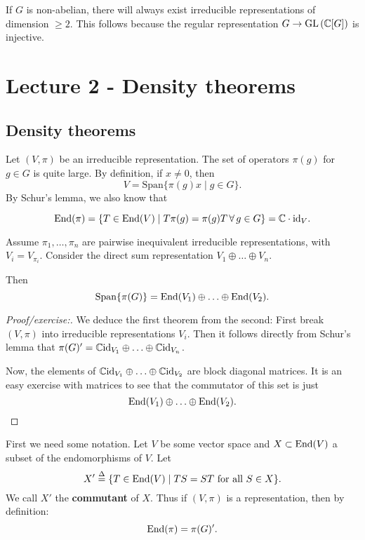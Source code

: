\documentclass[11pt, english]{article}
\begin{document}
\begin{remark}
  If $G$ is non-abelian, there will always exist irreducible representations of dimension $\geq 2$. This follows because the regular representation $G \to \operatorname{GL} \left( \mathbb{C}[G] \right)$ is injective.
\end{remark}

\section{Lecture 2 - Density theorems}

\subsection{Density theorems}

Let $(V,\pi)$ be an irreducible representation. The set of operators $\pi(g)$ for $g \in G$ is quite large. By definition, if $x \neq 0$, then
$$
V = \mathrm{Span} \{ \pi(g)x \mid g \in G \}.
$$
By Schur's lemma, we also know that 

$$
\operatorname{End}(\pi) = \{ T \in \operatorname{End}(V) \mid T\pi(g) = \pi(g) T \, \forall \, g \in G \} = \mathbb{C} \cdot \text{id}_V.
$$

\begin{thm}
\label{thmdensity}
 Assume $\pi_1,\ldots,\pi_n$ are pairwise inequivalent irreducible representations, with $V_i = V_{\pi_i}$. Consider the direct sum representation $V_1 \oplus \ldots \oplus V_n$.

Then
\[ 
\mathrm{Span}\{\pi(G)\} = \operatorname{End}(V_1) \oplus \ldots \oplus \operatorname{End}(V_2).
\]
\end{thm}
\begin{proof}[Proof/exercise:]
We deduce the first theorem from the second: First break $(V,\pi)$ into irreducible representations $V_i$. Then it follows directly from Schur's lemma that $\pi(G)' = \mathbb{C} \text{id}_{V_1} \oplus \ldots \oplus \mathbb{C} \text{id}_{V_n}$. 

Now, the elements of $\mathbb{C} \text{id}_{V_1} \oplus \ldots \oplus \mathbb{C} \text{id}_{V_2}$ are block diagonal matrices. It is an easy exercise with matrices to see that the commutator of this set is just
$$
\operatorname{End}(V_1) \oplus \ldots \oplus \operatorname{End}(V_2).
$$
\end{proof}

First we need some notation. Let $V$ be some vector space and $X \subset \operatorname{End}(V)$ a subset of the endomorphisms of $V$. Let 
\[
X' \stackrel{\Delta}{=}  \{ T \in \operatorname{End}(V) \mid TS = ST \text{ for all } S \in X \}.
\]
We call $X'$ the \textbf{commutant} of $X$. Thus if $(V,\pi)$ is a representation, then by definition:
\[
\operatorname{End}(\pi) = \pi(G)'.
\]
\end{document}
